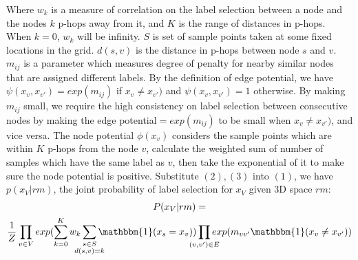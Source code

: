 \documentclass[conference]{IEEEtran}
\begin{document}
Where $w_{k}$ is a measure of correlation on the label selection between a node and the nodes $k$ p-hops away from it, and $K$ is the range of distances in p-hops.  When $k=0$, $w_k$ will be infinity. $S$ is set of sample points taken at some fixed locations in the grid. $d(s,v)$ is the distance in p-hops between node $s$ and $v$. $m_{ij}$ is a parameter which measures degree of penalty for nearby similar nodes that are assigned different labels. By the definition of edge potential, we have $\psi(x_{v},x_{v'}) = exp(m_{ij})$ if $x_{v}\neq x_{v'})$ and $\psi(x_{v},x_{v'}) = 1$ otherwise. By making $m_{ij}$ small, we require the high consistency on label selection between consecutive nodes by making the edge potential$=exp(m_{ij})$ to be small when $x_{v}\neq x_{v'})$, and vice versa. The node potential $\phi(x_{v})$ considers the sample points which are within $K$ p-hops from the node $v$, calculate the weighted sum of number of samples which have the same label as $v$, then take the exponential of it to make sure the node potential is positive. Substitute $(2),(3)$ into $(1)$, we have $p(x_{V}|rm)$, the joint probability of label selection for $x_V$ given 3D space $rm$:
\begin{multline}
P(x_{V}|rm)=\\
\frac{1}{Z}\prod_{v\in V} exp(\smashoperator{\sum_{k=0}^{K}} w_{k} \smashoperator{\sum_{\substack{s\in S\\ d(s,v)=k}}} \mathbbm{1}(x_{s}=x_{v})) \smashoperator{\prod_{(v,v')\in E}}exp(m_{vv'}\mathbbm{1}(x_{v}\neq x_{v'}))
\end{multline} 
\end{document}
